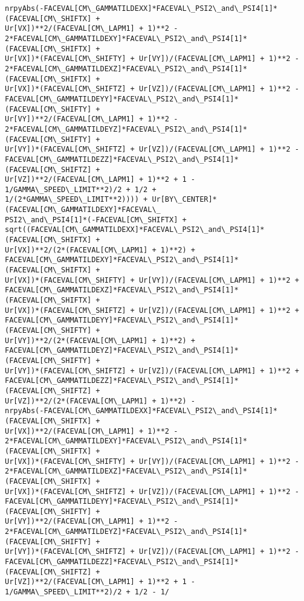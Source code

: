 \documentclass[landscape,letterpaper,10pt,english]{article}
\begin{document}
\begin{Verbatim}[commandchars=\\\{\}]
nrpyAbs(-FACEVAL[CM\_GAMMATILDEXX]*FACEVAL\_PSI2\_and\_PSI4[1]*(FACEVAL[CM\_SHIFTX] +
Ur[VX])**2/(FACEVAL[CM\_LAPM1] + 1)**2 -
2*FACEVAL[CM\_GAMMATILDEXY]*FACEVAL\_PSI2\_and\_PSI4[1]*(FACEVAL[CM\_SHIFTX] +
Ur[VX])*(FACEVAL[CM\_SHIFTY] + Ur[VY])/(FACEVAL[CM\_LAPM1] + 1)**2 -
2*FACEVAL[CM\_GAMMATILDEXZ]*FACEVAL\_PSI2\_and\_PSI4[1]*(FACEVAL[CM\_SHIFTX] +
Ur[VX])*(FACEVAL[CM\_SHIFTZ] + Ur[VZ])/(FACEVAL[CM\_LAPM1] + 1)**2 -
FACEVAL[CM\_GAMMATILDEYY]*FACEVAL\_PSI2\_and\_PSI4[1]*(FACEVAL[CM\_SHIFTY] +
Ur[VY])**2/(FACEVAL[CM\_LAPM1] + 1)**2 -
2*FACEVAL[CM\_GAMMATILDEYZ]*FACEVAL\_PSI2\_and\_PSI4[1]*(FACEVAL[CM\_SHIFTY] +
Ur[VY])*(FACEVAL[CM\_SHIFTZ] + Ur[VZ])/(FACEVAL[CM\_LAPM1] + 1)**2 -
FACEVAL[CM\_GAMMATILDEZZ]*FACEVAL\_PSI2\_and\_PSI4[1]*(FACEVAL[CM\_SHIFTZ] +
Ur[VZ])**2/(FACEVAL[CM\_LAPM1] + 1)**2 + 1 - 1/GAMMA\_SPEED\_LIMIT**2)/2 + 1/2 +
1/(2*GAMMA\_SPEED\_LIMIT**2)))) + Ur[BY\_CENTER]*(FACEVAL[CM\_GAMMATILDEXY]*FACEVAL\_
PSI2\_and\_PSI4[1]*(-FACEVAL[CM\_SHIFTX] +
sqrt((FACEVAL[CM\_GAMMATILDEXX]*FACEVAL\_PSI2\_and\_PSI4[1]*(FACEVAL[CM\_SHIFTX] +
Ur[VX])**2/(2*(FACEVAL[CM\_LAPM1] + 1)**2) +
FACEVAL[CM\_GAMMATILDEXY]*FACEVAL\_PSI2\_and\_PSI4[1]*(FACEVAL[CM\_SHIFTX] +
Ur[VX])*(FACEVAL[CM\_SHIFTY] + Ur[VY])/(FACEVAL[CM\_LAPM1] + 1)**2 +
FACEVAL[CM\_GAMMATILDEXZ]*FACEVAL\_PSI2\_and\_PSI4[1]*(FACEVAL[CM\_SHIFTX] +
Ur[VX])*(FACEVAL[CM\_SHIFTZ] + Ur[VZ])/(FACEVAL[CM\_LAPM1] + 1)**2 +
FACEVAL[CM\_GAMMATILDEYY]*FACEVAL\_PSI2\_and\_PSI4[1]*(FACEVAL[CM\_SHIFTY] +
Ur[VY])**2/(2*(FACEVAL[CM\_LAPM1] + 1)**2) +
FACEVAL[CM\_GAMMATILDEYZ]*FACEVAL\_PSI2\_and\_PSI4[1]*(FACEVAL[CM\_SHIFTY] +
Ur[VY])*(FACEVAL[CM\_SHIFTZ] + Ur[VZ])/(FACEVAL[CM\_LAPM1] + 1)**2 +
FACEVAL[CM\_GAMMATILDEZZ]*FACEVAL\_PSI2\_and\_PSI4[1]*(FACEVAL[CM\_SHIFTZ] +
Ur[VZ])**2/(2*(FACEVAL[CM\_LAPM1] + 1)**2) -
nrpyAbs(-FACEVAL[CM\_GAMMATILDEXX]*FACEVAL\_PSI2\_and\_PSI4[1]*(FACEVAL[CM\_SHIFTX] +
Ur[VX])**2/(FACEVAL[CM\_LAPM1] + 1)**2 -
2*FACEVAL[CM\_GAMMATILDEXY]*FACEVAL\_PSI2\_and\_PSI4[1]*(FACEVAL[CM\_SHIFTX] +
Ur[VX])*(FACEVAL[CM\_SHIFTY] + Ur[VY])/(FACEVAL[CM\_LAPM1] + 1)**2 -
2*FACEVAL[CM\_GAMMATILDEXZ]*FACEVAL\_PSI2\_and\_PSI4[1]*(FACEVAL[CM\_SHIFTX] +
Ur[VX])*(FACEVAL[CM\_SHIFTZ] + Ur[VZ])/(FACEVAL[CM\_LAPM1] + 1)**2 -
FACEVAL[CM\_GAMMATILDEYY]*FACEVAL\_PSI2\_and\_PSI4[1]*(FACEVAL[CM\_SHIFTY] +
Ur[VY])**2/(FACEVAL[CM\_LAPM1] + 1)**2 -
2*FACEVAL[CM\_GAMMATILDEYZ]*FACEVAL\_PSI2\_and\_PSI4[1]*(FACEVAL[CM\_SHIFTY] +
Ur[VY])*(FACEVAL[CM\_SHIFTZ] + Ur[VZ])/(FACEVAL[CM\_LAPM1] + 1)**2 -
FACEVAL[CM\_GAMMATILDEZZ]*FACEVAL\_PSI2\_and\_PSI4[1]*(FACEVAL[CM\_SHIFTZ] +
Ur[VZ])**2/(FACEVAL[CM\_LAPM1] + 1)**2 + 1 - 1/GAMMA\_SPEED\_LIMIT**2)/2 + 1/2 - 1/

\end{Verbatim}
\end{document}

